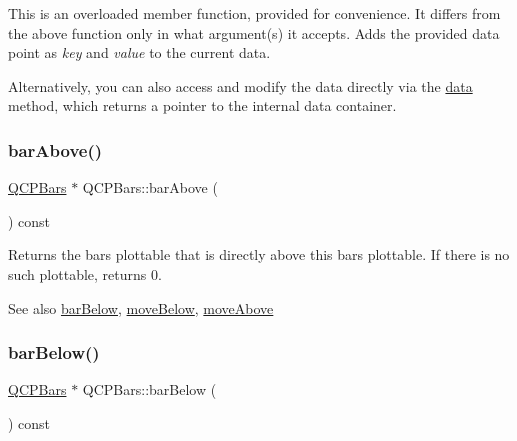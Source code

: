 This is an overloaded member function, provided for convenience. It differs from the above function only in what argument(s) it accepts. Adds the provided data point as {\itshape key} and {\itshape value} to the current data.

Alternatively, you can also access and modify the data directly via the \hyperlink{class_q_c_p_bars_a7e373a534d82e18ed27b3fafd1f08fae}{data} method, which returns a pointer to the internal data container. \mbox{\label{class_q_c_p_bars_ab97f2acd9f6cb40d2cc3c33d278f0e78}} 
\subsubsection{\texorpdfstring{bar\+Above()}{barAbove()}}
{\footnotesize\ttfamily \hyperlink{class_q_c_p_bars}{Q\+C\+P\+Bars} $\ast$ Q\+C\+P\+Bars\+::bar\+Above (\begin{DoxyParamCaption}{ }\end{DoxyParamCaption}) const\hspace{0.3cm}{\ttfamily [inline]}}

Returns the bars plottable that is directly above this bars plottable. If there is no such plottable, returns 0.

\begin{DoxySeeAlso}{See also}
\hyperlink{class_q_c_p_bars_a1b58664864b141f45e02044a855b3213}{bar\+Below}, \hyperlink{class_q_c_p_bars_a69fc371346980f19177c3d1ecdad78ee}{move\+Below}, \hyperlink{class_q_c_p_bars_ac22e00a6a41509538c21b04f0a57318c}{move\+Above} 
\end{DoxySeeAlso}
\mbox{\label{class_q_c_p_bars_a1b58664864b141f45e02044a855b3213}} 
\subsubsection{\texorpdfstring{bar\+Below()}{barBelow()}}
{\footnotesize\ttfamily \hyperlink{class_q_c_p_bars}{Q\+C\+P\+Bars} $\ast$ Q\+C\+P\+Bars\+::bar\+Below (\begin{DoxyParamCaption}{ }\end{DoxyParamCaption}) const\hspace{0.3cm}{\ttfamily [inline]}}


